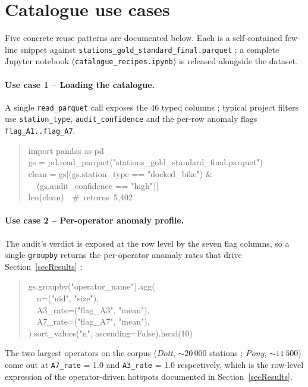 \documentclass[11pt,a4paper]{article}
\begin{document}
\appendix
\section{Catalogue use cases}

Five concrete reuse patterns are documented below. Each is a
self-contained few-line snippet against
\texttt{stations\_gold\_standard\_final.parquet} ; a complete
Jupyter notebook (\texttt{catalogue\_recipes.ipynb}) is released
alongside the dataset.

\paragraph{Use case 1 -- Loading the catalogue.}
A single \texttt{read\_parquet} call exposes the 46 typed columns ;
typical project filters use \texttt{station\_type},
\texttt{audit\_confidence} and the per-row anomaly flags
\texttt{flag\_A1..flag\_A7}.
\begin{quote}\small\ttfamily
import pandas as pd\\
gs = pd.read\_parquet("stations\_gold\_standard\_final.parquet")\\
clean = gs[(gs.station\_type == "docked\_bike") \&\\
\ \ (gs.audit\_confidence == "high")]\\
len(clean)\ \ \#\ returns\ 5{,}402
\end{quote}

\paragraph{Use case 2 -- Per-operator anomaly profile.}
The audit's verdict is exposed at the row level by the seven flag
columns, so a single \texttt{groupby} returns the per-operator
anomaly rates that drive Section~\ref{secResults} :
\begin{quote}\small\ttfamily
gs.groupby("operator\_name").agg(\\
\ \ n=("uid", "size"),\\
\ \ A3\_rate=("flag\_A3", "mean"),\\
\ \ A7\_rate=("flag\_A7", "mean"),\\
).sort\_values("n", ascending=False).head(10)
\end{quote}
The two largest operators on the corpus (\emph{Dott},
$\sim 20\,000$ stations ; \emph{Pony}, $\sim 11\,500$) come out at
\texttt{A7\_rate} = 1.0 and \texttt{A3\_rate} = 1.0 respectively,
which is the row-level expression of the operator-driven hotspots
documented in Section~\ref{secResults}.
\end{document}
